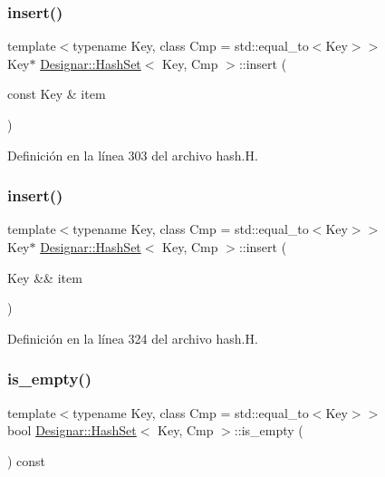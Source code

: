 \subsubsection{\texorpdfstring{insert()}{insert()}\hspace{0.1cm}{\footnotesize\ttfamily [1/2]}}
{\footnotesize\ttfamily template$<$typename Key, class Cmp = std\+::equal\+\_\+to$<$\+Key$>$$>$ \\
Key$\ast$ \hyperlink{class_designar_1_1_hash_set}{Designar\+::\+Hash\+Set}$<$ Key, Cmp $>$\+::insert (\begin{DoxyParamCaption}\item[{const Key \&}]{item }\end{DoxyParamCaption})\hspace{0.3cm}{\ttfamily [inline]}}



Definición en la línea 303 del archivo hash.\+H.

\mbox{\label{class_designar_1_1_hash_set_ac18e38933ad6611da769ad878062cfb4}} 
\subsubsection{\texorpdfstring{insert()}{insert()}\hspace{0.1cm}{\footnotesize\ttfamily [2/2]}}
{\footnotesize\ttfamily template$<$typename Key, class Cmp = std\+::equal\+\_\+to$<$\+Key$>$$>$ \\
Key$\ast$ \hyperlink{class_designar_1_1_hash_set}{Designar\+::\+Hash\+Set}$<$ Key, Cmp $>$\+::insert (\begin{DoxyParamCaption}\item[{Key \&\&}]{item }\end{DoxyParamCaption})\hspace{0.3cm}{\ttfamily [inline]}}



Definición en la línea 324 del archivo hash.\+H.

\mbox{\label{class_designar_1_1_hash_set_a2da1b699af1bf81e0965a35c4c4b3e35}} 
\subsubsection{\texorpdfstring{is\+\_\+empty()}{is\_empty()}}
{\footnotesize\ttfamily template$<$typename Key, class Cmp = std\+::equal\+\_\+to$<$\+Key$>$$>$ \\
bool \hyperlink{class_designar_1_1_hash_set}{Designar\+::\+Hash\+Set}$<$ Key, Cmp $>$\+::is\+\_\+empty (\begin{DoxyParamCaption}{ }\end{DoxyParamCaption}) const\hspace{0.3cm}{\ttfamily [inline]}}



